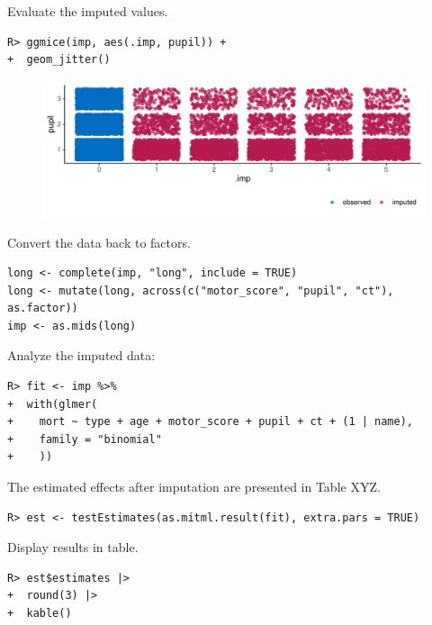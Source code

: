 \documentclass[
  article]{jss}
\begin{document}
Evaluate the imputed values.

\begin{verbatim}
R> ggmice(imp, aes(.imp, pupil)) +
+  geom_jitter()
\end{verbatim}

\begin{figure}[h]

{\centering \includegraphics{manuscript_files/figure-pdf/unnamed-chunk-41-1.pdf}

}

\end{figure}

Convert the data back to factors.

\begin{verbatim}
long <- complete(imp, "long", include = TRUE)
long <- mutate(long, across(c("motor_score", "pupil", "ct"), as.factor))
imp <- as.mids(long)
\end{verbatim}

Analyze the imputed data:

\begin{verbatim}
R> fit <- imp %>%
+  with(glmer(
+    mort ~ type + age + motor_score + pupil + ct + (1 | name),
+    family = "binomial"
+    ))
\end{verbatim}

The estimated effects after imputation are presented in Table XYZ.

\begin{verbatim}
R> est <- testEstimates(as.mitml.result(fit), extra.pars = TRUE)
\end{verbatim}

Display results in table.

\begin{verbatim}
R> est$estimates |> 
+  round(3) |>
+  kable()
\end{verbatim}
\end{document}
